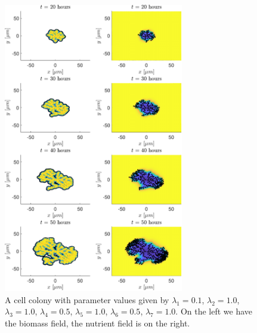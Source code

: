 \begin{figure}[!htb] %
    \centering
    \includegraphics[width= 0.7\textwidth]{
        chapter2/figures/t_all__L1_0o10_L2_1o00_L3_1o00_L4_0o50_L5_1o00_L6_0o50_L7_1o00.pdf}
    \caption{A cell colony with parameter values given by
             $\lambda_1 = 0.1$,  
             $\lambda_2 = 1.0$, 
             $\lambda_3 = 1.0$, 
             $\lambda_4 = 0.5$, 
             $\lambda_5 = 1.0$, 
             $\lambda_6 = 0.5$, 
             $\lambda_7 = 1.0$. 
             On the left we have the biomass field, the nutrient field is on the right.}
    \label{fig: sdsd}
\end{figure}


\newpage


